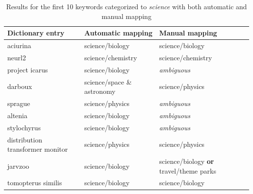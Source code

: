 \begin{table}[h]
\centering
\renewcommand{\arraystretch}{1.25}
\begin{tabularx}{\textwidth}{ l|X|X }
{\bf Dictionary entry}           & {\bf Automatic mapping}  & {\bf Manual mapping}                  \\ \hline
aciurina                         & science/biology          & science/biology                       \\ \hline
neurl2                           & science/chemistry        & science/chemistry                     \\ \hline
project icarus                   & science/biology          & {\it ambiguous}                       \\ \hline
darboux                          & science/space \& astronomy & science/physics                       \\ \hline
sprague                          & science/physics          & {\it ambiguous}                       \\ \hline
altenia                          & science/biology          & {\it ambiguous}                       \\ \hline
stylochyrus                      & science/biology          & {\it ambiguous}                       \\ \hline
distribution transformer monitor & science/physics          & science/physics                       \\ \hline
jarvzoo                          & science/biology          & science/biology \textbf{or} travel/theme parks \\ \hline
tomopterus similis               & science/biology          & science/biology                       
\end{tabularx}
\caption[Comparison of manual and automatic mapping, science]{Results for the first 10 keywords categorized to \emph{science} with both automatic and manual mapping}
\label{tab:manual_mapping_science_iab-1}
\end{table}



